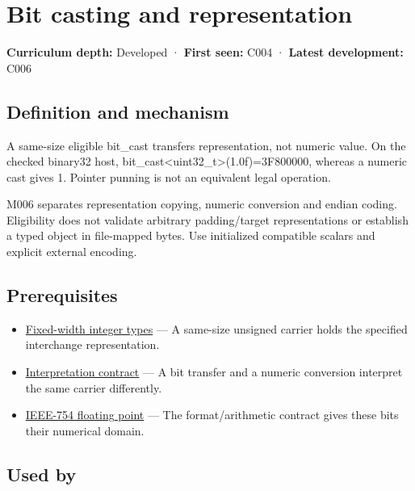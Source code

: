 \hypertarget{appendix-34ee45f161c1}{}
\section{Bit casting and representation}\label{appendix-34ee45f161c1-bit-casting-and-representation}

\textbf{Curriculum depth:} Developed · \textbf{First seen:} C004 · \textbf{Latest development:} C006

\subsection{Definition and mechanism}\label{appendix-34ee45f161c1-definition-and-mechanism}

A same-size eligible bit\_cast transfers representation, not numeric value. On the checked binary32 host, bit\_cast\textless uint32\_t\textgreater{}(1.0f)=3F800000, whereas a numeric cast gives 1. Pointer punning is not an equivalent legal operation.

M006 separates representation copying, numeric conversion and endian coding. Eligibility does not validate arbitrary padding/target representations or establish a typed object in file-mapped bytes. Use initialized compatible scalars and explicit external encoding.

\subsection{Prerequisites}\label{appendix-34ee45f161c1-prerequisites}

\begin{itemize}
\tightlist
\item
  \hyperref[appendix-cc04044b5782]{Fixed-width integer types} --- A same-size unsigned carrier holds the specified interchange representation.
\item
  \hyperref[appendix-f414bd4ed05c]{Interpretation contract} --- A bit transfer and a numeric conversion interpret the same carrier differently.
\item
  \hyperref[appendix-343615f49ddf]{IEEE-754 floating point} --- The format/arithmetic contract gives these bits their numerical domain.
\end{itemize}

\subsection{Used by}\label{appendix-34ee45f161c1-used-by}


